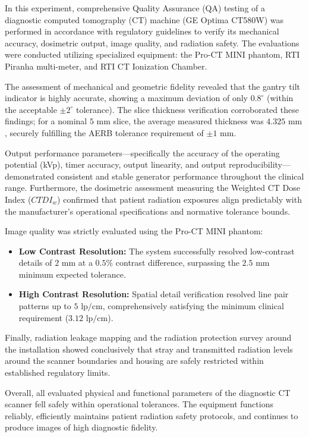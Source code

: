 

In this experiment, comprehensive Quality Assurance (QA) testing of a diagnostic computed tomography (CT) machine (GE Optima CT580W) was performed in accordance with regulatory guidelines to verify its mechanical accuracy, dosimetric output, image quality, and radiation safety. The evaluations were conducted utilizing specialized equipment: the Pro-CT MINI phantom, RTI Piranha multi-meter, and RTI CT Ionization Chamber. 

The assessment of mechanical and geometric fidelity revealed that the gantry tilt indicator is highly accurate, showing a maximum deviation of only $0.8^\circ$ (within the acceptable $\pm 2^\circ$ tolerance). The slice thickness verification corroborated these findings; for a nominal $5\text{ mm}$ slice, the average measured thickness was $4.325\text{ mm}$, securely fulfilling the AERB tolerance requirement of $\pm 1\text{ mm}$.

Output performance parameters—specifically the accuracy of the operating potential (kVp), timer accuracy, output linearity, and output reproducibility—demonstrated consistent and stable generator performance throughout the clinical range. Furthermore, the dosimetric assessment measuring the Weighted CT Dose Index ($CTDI_w$) confirmed that patient radiation exposures align predictably with the manufacturer's operational specifications and normative tolerance bounds.

Image quality was strictly evaluated using the Pro-CT MINI phantom:
\begin{itemize}
    \item \textbf{Low Contrast Resolution:} The system successfully resolved low-contrast details of $2\text{ mm}$ at a $0.5\%$ contrast difference, surpassing the $2.5\text{ mm}$ minimum expected tolerance.
    \item \textbf{High Contrast Resolution:} Spatial detail verification resolved line pair patterns up to $5\text{ lp/cm}$, comprehensively satisfying the minimum clinical requirement ($3.12\text{ lp/cm}$).
\end{itemize}

Finally, radiation leakage mapping and the radiation protection survey around the installation showed conclusively that stray and transmitted radiation levels around the scanner boundaries and housing are safely restricted within established regulatory limits.

Overall, all evaluated physical and functional parameters of the diagnostic CT scanner fell safely within operational tolerances. The equipment functions reliably, efficiently maintains patient radiation safety protocols, and continues to produce images of high diagnostic fidelity.